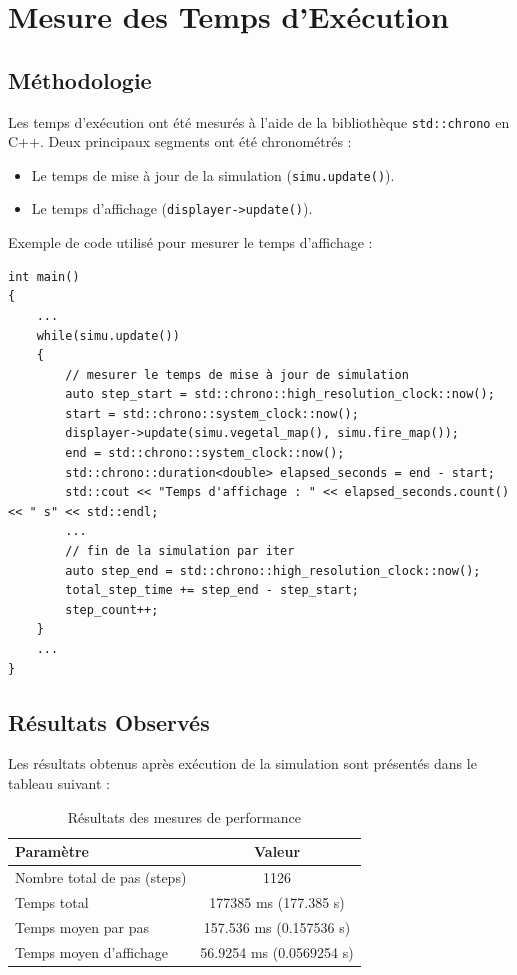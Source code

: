 \documentclass[a4paper,12pt]{article}
\begin{document}
\section{Mesure des Temps d'Exécution}

\subsection{Méthodologie}
Les temps d'exécution ont été mesurés à l'aide de la bibliothèque \texttt{std::chrono} en C++. Deux principaux segments ont été chronométrés :
\begin{itemize}
    \item Le temps de mise à jour de la simulation (\texttt{simu.update()}).
    \item Le temps d'affichage (\texttt{displayer->update()}).
\end{itemize}

Exemple de code utilisé pour mesurer le temps d'affichage :
\begin{lstlisting}
int main()
{
    ...
    while(simu.update())
    {
        // mesurer le temps de mise à jour de simulation
        auto step_start = std::chrono::high_resolution_clock::now();
        start = std::chrono::system_clock::now();
        displayer->update(simu.vegetal_map(), simu.fire_map());
        end = std::chrono::system_clock::now();
        std::chrono::duration<double> elapsed_seconds = end - start;
        std::cout << "Temps d'affichage : " << elapsed_seconds.count() << " s" << std::endl;
        ...
        // fin de la simulation par iter
        auto step_end = std::chrono::high_resolution_clock::now();
        total_step_time += step_end - step_start;
        step_count++;
    }
    ...
}
\end{lstlisting}

\subsection{Résultats Observés}
Les résultats obtenus après exécution de la simulation sont présentés dans le tableau suivant :

\begin{table}[h]
    \centering
    \begin{tabular}{|l|c|}
        \hline
        \textbf{Paramètre}            & \textbf{Valeur}         \\
        \hline
        Nombre total de pas (steps)   & 1126                    \\
        Temps total                   & 177385 ms (177.385 s)   \\
        Temps moyen par pas           & 157.536 ms (0.157536 s) \\
        Temps moyen d'affichage       & 56.9254 ms (0.0569254 s) \\
        \hline
    \end{tabular}
    \caption{Résultats des mesures de performance}
    \label{tab:performance}
\end{table}
\end{document}
